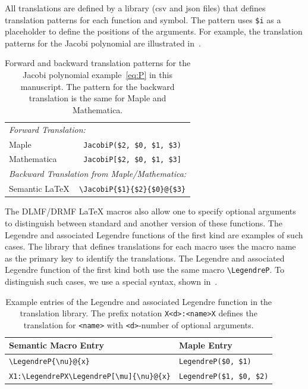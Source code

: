 \documentclass[a4paper,11pt]{article}
\newcommand{\DLMF}{DLMF}
\newcommand{\DRMF}{DRMF}
\newcommand{\Maple}{Maple}
\newcommand{\Mathematica}{Mathematica}
\newcommand{\Macro}{\DLMF/\DRMF{} \LaTeX{} macro}
\theoremstyle{defTheoStyle}
\theoremstyle{defExampStyle}
\begin{document}
All translations are defined by a library (\gls*{csv} and \gls*{json} files) that defines translation patterns for each function and symbol. The pattern uses \verb|$i| as a placeholder to define the positions of the arguments. For example, the translation patterns for the Jacobi polynomial are illustrated in~.

\begin{table}[ht]
	\centering
	\begin{tabular}{lc}
		\hline
		\multicolumn{2}{l}{\textit{Forward Translation:}} \\
		\Maple & \verb|JacobiP($2, $0, $1, $3)| \\
		\Mathematica & \verb|JacobiP[$2, $0, $1, $3]|\\
		\hline
		\multicolumn{2}{l}{\textit{Backward Translation from \Maple/\Mathematica:}} \\
		Semantic \LaTeX & \verb|\JacobiP{$1}{$2}{$0}@{$3}|\\
		\hline
	\end{tabular}
	\caption{Forward and backward translation patterns for the Jacobi polynomial example~\eqref{eq:P} in this manuscript. The pattern for the backward translation is the same for \Maple{} and \Mathematica.}
	\label{tab:placeholder_ex2}
\end{table}

The \Macro s also allow one to specify optional arguments to distinguish between standard and another version of these functions. The Legendre and associated Legendre functions of the first kind are examples of such cases. The library that defines translations for each macro uses the macro name as the primary key to identify the translations. The Legendre and associated Legendre function of the first kind both use the same macro \verb|\LegendreP|. To distinguish such cases, we use a special syntax, shown in~.

\begin{table}[ht!]
	\centering
	\begin{tabular}{ll}
		\hline
		Semantic Macro Entry & \Maple{} Entry \\
		\hline
		\verb|\LegendreP{\nu}@{x}| & \verb|LegendreP($0, $1)| \\
		\verb|X1:\LegendrePX\LegendreP[\mu]{\nu}@{x}| & \verb|LegendreP($1, $0, $2)|\\
		\hline
	\end{tabular}
	\caption{Example entries of the Legendre and associated Legendre function in the translation library. The prefix notation \texttt{X<d>:<name>X} defines the translation for \texttt{<name>} with \texttt{<d>}-number of optional arguments.}
	\label{tab:legendreP-lex}
\end{table}
\end{document}
